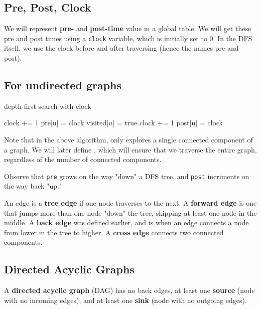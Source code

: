 \documentclass[titlepage, 12pt, leqno]{article}
\begin{document}
\subsection{Pre, Post, Clock}
We will represent \textbf{pre-} and \textbf{post-time} value in a global table.
We will get these pre and post times using a \texttt{clock} variable, which is
initially set to 0. In the DFS itself, we use the clock before and after
traversing (hence the names pre and post).
\subsection{For undirected graphs}
\begin{algorithm}
\caption{depth-first search with clock}
\begin{algorithmic}[1]
\State clock += 1
\State pre[u] = clock
\State visited[$u$] = true
        \State {}
    \EndIf
\EndFor
\State clock += 1
\State post[u] = clock
\EndProcedure 
\end{algorithmic}
\end{algorithm}

Note that in the above algorithm,  only explores a single connected
component of a graph. We will later define , which will ensure
that we traverse the entire graph, regardless of the number of connected
components.

Observe that \texttt{pre} grows on the way "down" a DFS tree, and \texttt{post}
incriments on the way back "up." 

\begin{definition}
    An edge is a \textbf{tree edge} if one node traverses to the next. A
    \textbf{forward edge} is one that jumps more than one node "down" the
    tree, skipping at least one node in the middle. A \textbf{back edge} was
    defined earlier, and is when an edge connects a node from lower in the
    tree to higher. A \textbf{cross edge} connects two connected components.
\end{definition}

\subsection{Directed Acyclic Graphs}
\begin{definition}
    A \textbf{directed acyclic graph} (DAG) has no back edges, at least one
    \textbf{source} (node with no incoming edges), and at least one
    \textbf{sink} (node with no outgoing edges).
\end{definition}
\end{document}
